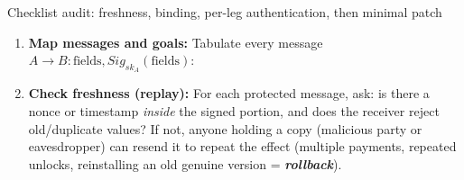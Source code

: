 \documentclass[12pt, a4paper]{article}
\newcommand{\term}[1]{\textbf{\textit{#1}}}        %
\begin{document}
\begin{schemebox}{Checklist audit: freshness, binding, per-leg authentication, then minimal patch}
\begin{enumerate}[label=\textbf{Step \arabic*:}, leftmargin=*]
    \item \textbf{Map messages and goals:} Tabulate every message $A \to B : \text{fields}, Sig_{sk_A}(\text{fields})$:
    \item \textbf{Check freshness (replay):} For each protected message, ask: is there a nonce or timestamp \emph{inside} the signed portion, and does the receiver reject old/duplicate values? If not, anyone holding a copy (malicious party or eavesdropper) can resend it to repeat the effect (multiple payments, repeated unlocks, reinstalling an old genuine version = \term{rollback}).


\end{enumerate}
\end{schemebox}
\end{document}
